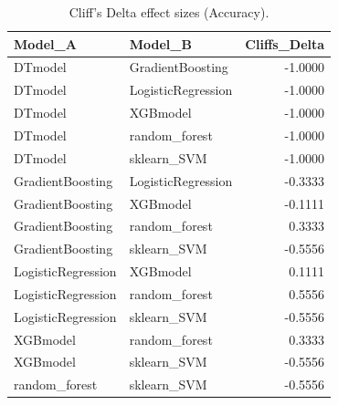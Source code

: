 \begin{table}[t]
\centering
\begin{tabular}{llr}
\toprule
Model_A & Model_B & Cliffs_Delta \\
\midrule
DTmodel & GradientBoosting & -1.0000 \\
DTmodel & LogisticRegression & -1.0000 \\
DTmodel & XGBmodel & -1.0000 \\
DTmodel & random_forest & -1.0000 \\
DTmodel & sklearn_SVM & -1.0000 \\
GradientBoosting & LogisticRegression & -0.3333 \\
GradientBoosting & XGBmodel & -0.1111 \\
GradientBoosting & random_forest & 0.3333 \\
GradientBoosting & sklearn_SVM & -0.5556 \\
LogisticRegression & XGBmodel & 0.1111 \\
LogisticRegression & random_forest & 0.5556 \\
LogisticRegression & sklearn_SVM & -0.5556 \\
XGBmodel & random_forest & 0.3333 \\
XGBmodel & sklearn_SVM & -0.5556 \\
random_forest & sklearn_SVM & -0.5556 \\
\bottomrule
\end{tabular}
\caption{Cliff's Delta effect sizes (Accuracy).}
\label{tab:cliffs_Accuracy}
\end{table}